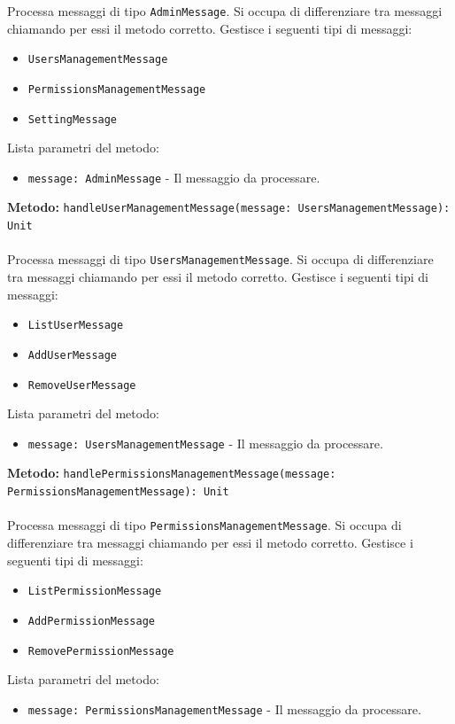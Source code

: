 \documentclass[a4paper]{article}
\begin{document}
			Processa messaggi di tipo \texttt{AdminMessage}. Si occupa di differenziare tra messaggi chiamando per essi il metodo corretto.
			Gestisce i seguenti tipi di messaggi:
			\begin{itemize}
				\item \texttt{UsersManagementMessage}
				\item \texttt{PermissionsManagementMessage}
				\item \texttt{SettingMessage}
			\end{itemize}
			Lista parametri del metodo:
			\begin{itemize}
				\item \texttt{message: AdminMessage} - Il messaggio da processare.
			\end{itemize}
		\textbf{Metodo: }\texttt{handleUserManagementMessage(message: UsersManagementMessage): Unit}
			\\ \\
			Processa messaggi di tipo \texttt{UsersManagementMessage}. Si occupa di differenziare tra messaggi chiamando per essi il metodo corretto.
			Gestisce i seguenti tipi di messaggi:
			\begin{itemize}
				\item \texttt{ListUserMessage}
				\item \texttt{AddUserMessage}
				\item \texttt{RemoveUserMessage}
			\end{itemize}
			Lista parametri del metodo:
			\begin{itemize}
				\item \texttt{message: UsersManagementMessage} - Il messaggio da processare.
			\end{itemize}
		\textbf{Metodo: }\texttt{handlePermissionsManagementMessage(message: PermissionsManagementMessage): Unit}
			\\ \\
			Processa messaggi di tipo \texttt{PermissionsManagementMessage}. Si occupa di differenziare tra messaggi chiamando per essi il metodo corretto.
			Gestisce i seguenti tipi di messaggi:
			\begin{itemize}
				\item \texttt{ListPermissionMessage}
				\item \texttt{AddPermissionMessage}
				\item \texttt{RemovePermissionMessage}
			\end{itemize}
			Lista parametri del metodo:
			\begin{itemize}
				\item \texttt{message: PermissionsManagementMessage} - Il messaggio da processare.
			\end{itemize}
\end{document}
